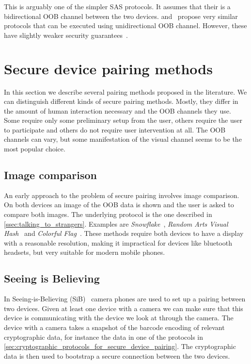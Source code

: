 \documentclass[conference, 11pt]{sty/IEEEtran}
\begin{document}
This is arguably one of the simpler SAS protocols.
It assumes that their is a bidirectional OOB channel between the two devices.
\cite{saxena2008automated} and~\cite{saxena2006secure} propose very similar protocols that can be executed using unidirectional OOB channel.
However, these have slightly weaker security guarantees~\cite{saxena2008automated}.

\section{Secure device pairing methods}
\label{sec:secure_device_pairing_methods}

In this section we describe several pairing methods proposed in the literature.
We can distinguish different kinds of secure pairing methods.
Mostly, they differ in the amount of human interaction necessary and the OOB channels they use.
Some require only some preliminary setup from the user, others require the user to participate and others do not require user intervention at all.
The OOB channels can vary, but some manifestation of the visual channel seems to be the most popular choice.

\subsection{Image comparison}
An early approach to the problem of secure pairing involves image comparison.
On both devices an image of the OOB data is shown and the user is asked to compare both images.
The underlying protocol is the one described in \autoref{ssec:talking_to_strangers}.
Examples are \textit{Snowflake}~\cite{goldberg1996visual}, \textit{Random Arts Visual Hash}~\cite{perrig1999hash} and \textit{Colorful Flag}~\cite{dohrmann2002public}.
These methods require both devices to have a display with a reasonable resolution, making it impractical for devices like bluetooth headsets, but very suitable for modern mobile phones.

\subsection{Seeing is Believing}
In Seeing-is-Believing (SiB)~\cite{mccune2005seeing} camera phones are used to set up a pairing between two devices.
Given at least one device with a camera we can make sure that this device is communicating with the device we look at through the camera.
The device with a camera takes a snapshot of the barcode encoding of relevant cryptographic data, for instance the data in one of the protocols in \autoref{sec:cryptographic_protocols_for_secure_device_pairing}.
The cryptographic data is then used to bootstrap a secure connection between the two devices.
\end{document}
